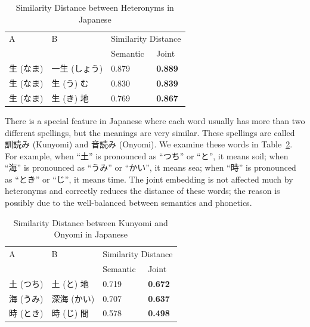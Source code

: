 \vspace{0.4cm}    
\begin{table}[h]
    \centering
    \begin{CJK}{UTF8}{long}
        \begin{tabularx}{\textwidth}{bbbb}
            \toprule
            \multirow{2.5}{*}{A} & \multirow{2.5}{*}{B} & \multicolumn{2}{c}{Similarity Distance} \\
            \cmidrule(lr){3-4} {} & {} & Semantic & Joint \\\midrule
            生 (なま) & 一生 (しょう) & 0.879 & \textbf{0.889} \\
            生 (なま) & 生 (う) む & 0.830 & \textbf{0.839} \\
            生 (なま) & 生 (き) 地 & 0.769 & \textbf{0.867} \\\bottomrule
        \end{tabularx}
    \end{CJK}
    \caption{Similarity Distance between Heteronyms in Japanese}
    \label{tab:analysis_heteronym2}
\end{table}

\begin{CJK}{UTF8}{long}
    There is a special feature in Japanese where each word usually has more than two different spellings, but the meanings are very similar. These spellings are called 訓読み (Kunyomi) and 音読み (Onyomi). We examine these words in Table~\ref{tab:analysis_heteronym3}. For example, when ``土'' is pronounced as ``つち'' or ``と'', it means soil; when ``海'' is pronounced as ``うみ'' or ``かい'', it means sea; when ``時'' is pronounced as ``とき'' or ``じ'', it means time. The joint embedding is not affected much by heteronyms and correctly reduces the distance of these words; the reason is possibly due to the well-balanced between semantics and phonetics.
\end{CJK}

\vspace{0.4cm}    
\begin{table}[h]
    \centering
    \begin{CJK}{UTF8}{long}
        \begin{tabularx}{\textwidth}{bbbb}
            \toprule
            \multirow{2.5}{*}{A} & \multirow{2.5}{*}{B} & \multicolumn{2}{c}{Similarity Distance} \\
            \cmidrule(lr){3-4} {} & {} & Semantic & Joint \\\midrule
            土 (つち) & 土 (と) 地 & 0.719 & \textbf{0.672} \\
            海 (うみ) & 深海 (かい) & 0.707 & \textbf{0.637} \\
            時 (とき) & 時 (じ) 間 & 0.578 & \textbf{0.498} \\\bottomrule
        \end{tabularx}
    \end{CJK}
    \caption{Similarity Distance between Kunyomi and Onyomi in Japanese}
    \label{tab:analysis_heteronym3}
\end{table}